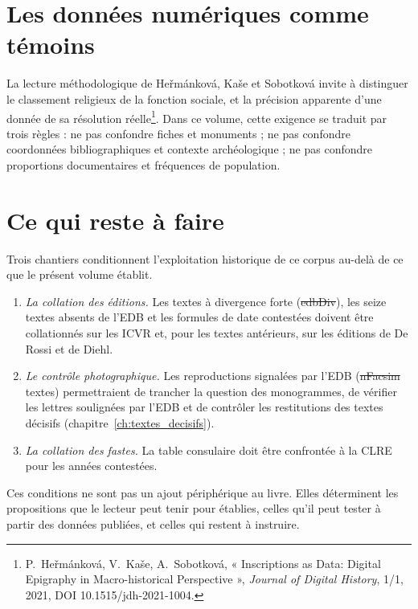 \section{Les données numériques comme témoins}

La lecture méthodologique de Heřmánková, Kaše et Sobotková invite à distinguer le classement religieux de la fonction sociale, et la précision apparente d’une donnée de sa résolution réelle\footnote{P.~Heřmánková, V.~Kaše, A.~Sobotková, « Inscriptions as Data: Digital Epigraphy in Macro-historical Perspective », \emph{Journal of Digital History}, 1/1, 2021, DOI 10.1515/jdh-2021-1004.}. Dans ce volume, cette exigence se traduit par trois règles : ne pas confondre fiches et monuments ; ne pas confondre coordonnées bibliographiques et contexte archéologique ; ne pas confondre proportions documentaires et fréquences de population.

\section{Ce qui reste à faire}

Trois chantiers conditionnent l’exploitation historique de ce corpus au-delà de ce que le présent volume établit.

\begin{enumerate}
\item \emph{La collation des éditions.} Les textes à divergence forte (\st{edbDiv}), les seize textes absents de l’EDB et les formules de date contestées doivent être collationnés sur les ICVR et, pour les textes antérieurs, sur les éditions de De Rossi et de Diehl.
\item \emph{Le contrôle photographique.} Les reproductions signalées par l’EDB (\st{nFacsim} textes) permettraient de trancher la question des monogrammes, de vérifier les lettres soulignées par l’EDB et de contrôler les restitutions des textes décisifs (chapitre~\ref{ch:textes_decisifs}).
\item \emph{La collation des fastes.} La table consulaire doit être confrontée à la CLRE pour les années contestées.
\end{enumerate}

Ces conditions ne sont pas un ajout périphérique au livre. Elles déterminent les propositions que le lecteur peut tenir pour établies, celles qu’il peut tester à partir des données publiées, et celles qui restent à instruire.
